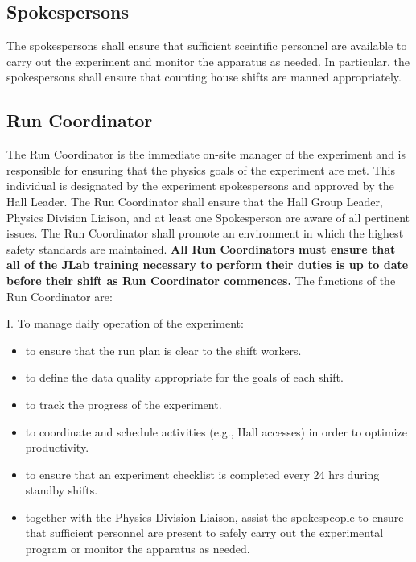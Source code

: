 \documentclass[10pt]{article}
\begin{document}
\subsection{Spokespersons}
The spokespersons shall ensure that sufficient sceintific
personnel are available to
carry out the experiment and monitor the apparatus as needed.
In particular, the spokespersons shall ensure that counting house
shifts are manned appropriately.

\subsection{Run Coordinator}

 The Run Coordinator is the  immediate on-site manager of the experiment
and is responsible for ensuring that the physics goals of the experiment
are met. This individual is designated by the experiment spokespersons
and approved by the Hall Leader.  The Run Coordinator shall ensure that
the Hall Group Leader, Physics Division Liaison, and at least
one Spokesperson are aware of all pertinent issues. The Run Coordinator
shall promote an environment in which the highest safety
standards are maintained.
{\bf All Run Coordinators must ensure that all of the JLab training necessary to perform
their duties is up to date before their shift as Run Coordinator commences.}
The functions of the Run Coordinator  are:

\noindent I. To manage daily operation of the experiment:

\begin{itemize}

\item to ensure that the run plan is clear to the shift workers.

\item to define the data quality appropriate for the goals of each shift.

\item to track the progress of the experiment.

\item to coordinate and schedule activities (e.g.,
Hall accesses) in order to optimize productivity.

\item to ensure that an experiment checklist is completed every 24 hrs during
standby shifts.

\item together with the Physics Division Liaison,
assist the spokespeople to ensure that
sufficient personnel are present to safely carry out the experimental
program or monitor the apparatus as needed.

\end{itemize}
\end{document}

